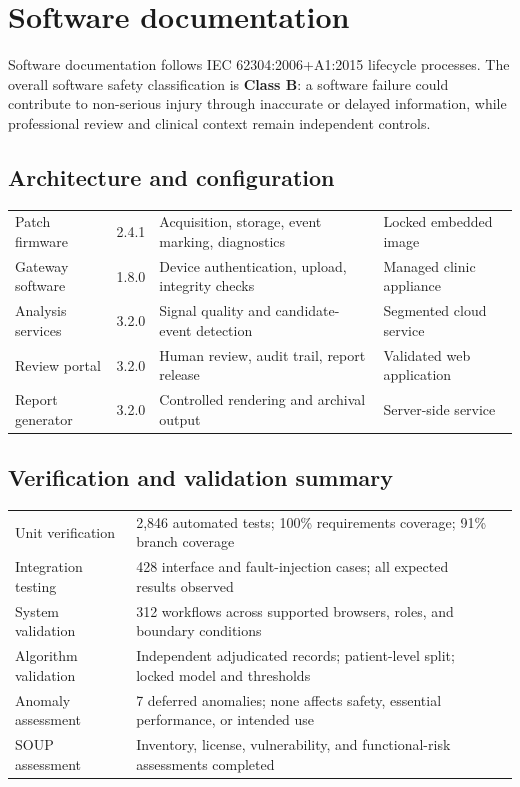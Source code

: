 \section{Software documentation}

Software documentation follows IEC 62304:2006+A1:2015 lifecycle processes. The overall software safety classification is \textbf{Class B}: a software failure could contribute to non-serious injury through inaccurate or delayed information, while professional review and clinical context remain independent controls.

\subsection{Architecture and configuration}
\begin{tabularx}{\textwidth}{@{}L{1.42in}L{1.18in}Y Y@{}}
\toprule
{} &  &  &  \\
\midrule
Patch firmware & 2.4.1 & Acquisition, storage, event marking, diagnostics & Locked embedded image \\
Gateway software & 1.8.0 & Device authentication, upload, integrity checks & Managed clinic appliance \\
Analysis services & 3.2.0 & Signal quality and candidate-event detection & Segmented cloud service \\
Review portal & 3.2.0 & Human review, audit trail, report release & Validated web application \\
Report generator & 3.2.0 & Controlled rendering and archival output & Server-side service \\
\bottomrule
\end{tabularx}

\subsection{Verification and validation summary}
\begin{tabularx}{\textwidth}{@{}L{1.55in}Y L{1.12in}@{}}
\toprule
{} &  &  \\
\midrule
Unit verification & 2,846 automated tests; 100\% requirements coverage; 91\% branch coverage &  \\
Integration testing & 428 interface and fault-injection cases; all expected results observed &  \\
System validation & 312 workflows across supported browsers, roles, and boundary conditions &  \\
Algorithm validation & Independent adjudicated records; patient-level split; locked model and thresholds &  \\
Anomaly assessment & 7 deferred anomalies; none affects safety, essential performance, or intended use &  \\
SOUP assessment & Inventory, license, vulnerability, and functional-risk assessments completed &  \\
\bottomrule
\end{tabularx}

